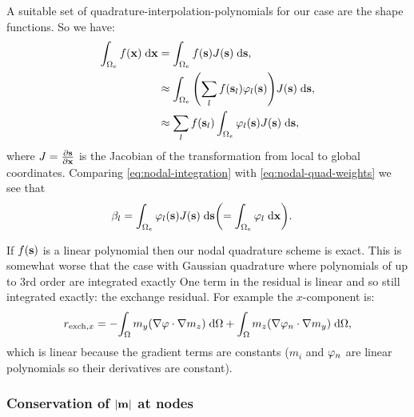 A suitable set of quadrature-interpolation-polynomials for our case are the shape functions.
So we have:
\begin{equation}
  \label{eq:nodal-quad-weights}
  \begin{aligned}
    \int_{\Omega_e} f(\mathbf{x}) {\; \text{d}} \mathbf{x} &= \int_{\Omega_e} f({\mathbf{s}}) J({\mathbf{s}}) {\; \text{d}} {\mathbf{s}}, \\
    &\approx \int_{\Omega_e} {\left( \sum_l f({\mathbf{s}}_l) \varphi_l({\mathbf{s}}) \right)} J({\mathbf{s}}) {\; \text{d}} {\mathbf{s}}, \\
    &\approx \sum_l f({\mathbf{s}}_l) \int_{\Omega_e} \varphi_l({\mathbf{s}}) J({\mathbf{s}}) {\; \text{d}} {\mathbf{s}},
  \end{aligned} 
\end{equation}
where $J =  \frac{\partial {\mathbf{s}}}{\partial \mathbf{x}}$ is the Jacobian of the transformation from local to global coordinates.
Comparing \eqref{eq:nodal-integration} with \eqref{eq:nodal-quad-weights} we see that
\begin{equation}
  \begin{aligned}
    \beta_l &= \int_{\Omega_e} \varphi_l({\mathbf{s}}) J({\mathbf{s}}) {\; \text{d}} {\mathbf{s}} {\left( = \int_{\Omega_e} \varphi_l {\; \text{d}}\mathbf{x} \right)}.
  \end{aligned} 
\end{equation}

If $f({\mathbf{s}})$ is a linear polynomial then our nodal quadrature scheme is exact.
This is somewhat worse that the case with Gaussian quadrature where polynomials of up to 3rd order are integrated exactly
One term in the residual is linear and so still integrated exactly: the exchange residual. For example the $x$-component is:
\begin{equation}
  \begin{aligned}
    r_{\text{exch},x} = - {\int_{\Omega}  m_y {\left( \nabla \varphi \cdot \nabla m_z \right)} {\; \text{d}} {\Omega}} + {\int_{\Omega}  m_z {\left( \nabla \varphi_n \cdot \nabla m_y \right)} {\; \text{d}} {\Omega}},
  \end{aligned}
\end{equation}
which is linear because the gradient terms are constants ($m_i$ and $\varphi_n$ are linear polynomials so their derivatives are constant).


\subsubsection{Conservation of $\left|{\mathbf{m}} \right|$ at nodes}
\label{sec:weak-cons-absmv}


